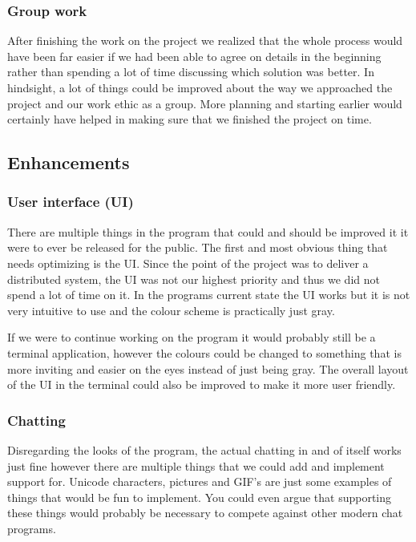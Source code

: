 \documentclass[12pt, a4paper]{article}
\begin{document}
\subsubsection{Group work}

After finishing the work on the project we realized that the whole process would have been far easier if we had been able to agree on details in the beginning rather than spending a lot of time discussing which solution was better. In hindsight, a lot of things could be improved about the way we approached the project and our work ethic as a group. More planning and starting earlier would certainly have helped in making sure that we finished the project on time. 

\subsection{Enhancements} %

\subsubsection{User interface (UI)}

There are multiple things in the program that could and should be improved it it were to ever be released for the public. The first and most obvious thing that needs optimizing is the UI. Since the point of the project was to deliver a distributed system, the UI was not our highest priority and thus we did not spend a lot of time on it. In the programs current state the UI works but it is not very intuitive to use and the colour scheme is practically just gray.

If we were to continue working on the program it would probably still be a terminal application, however the colours could be changed to something that is more inviting and easier on the eyes instead of just being gray. The overall layout of the UI in the terminal could also be improved to make it more user friendly.

\subsubsection{Chatting}

Disregarding the looks of the program, the actual chatting in and of itself works just fine however there are multiple things that we could add and implement support for. Unicode characters, pictures and GIF's are just some examples of things that would be fun to implement. You could even argue that supporting these things would probably be necessary to compete against other modern chat programs.
\end{document}

